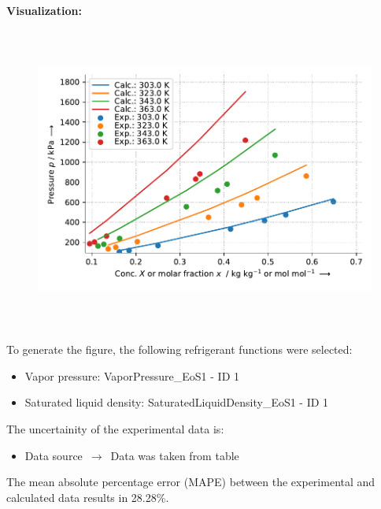 \textbf{Visualization:}
%
\begin{figure}[!htp]
{\noindent\includegraphics[height=10cm, keepaspectratio]{figs/abs/abs_R-134a_lubricant_PEC9_FloryHuggins_1.pdf}}
\end{figure}
%

To generate the figure, the following refrigerant functions were selected:
\begin{itemize}
\item Vapor pressure: VaporPressure\_EoS1 - ID 1
\item Saturated liquid density: SaturatedLiquidDensity\_EoS1 - ID 1
\end{itemize}

The uncertainity of the experimental data is:
\begin{itemize}
\item Data source $\,\to\,$ Data was taken from table
\end{itemize}

The mean absolute percentage error (MAPE) between the experimental and calculated data results in 28.28\%.
\FloatBarrier
\newpage
